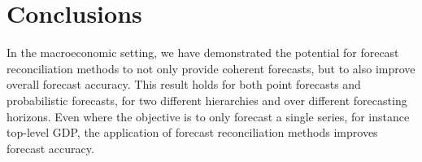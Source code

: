 \documentclass[graybox]{svmult}
\begin{document}
%
%
%
%
%
%
%
%
%
%
%




\pagebreak

\section{Conclusions}

In the macroeconomic setting, we have demonstrated the potential for forecast reconciliation methods to not only provide coherent forecasts, but to also improve overall forecast accuracy.  This result holds for both point forecasts and probabilistic forecasts, for two different hierarchies and over different forecasting horizons.  Even where the objective is to only forecast a single series, for instance top-level GDP, the application of forecast reconciliation methods improves forecast accuracy.
\end{document}
